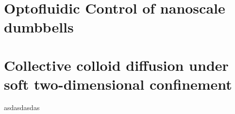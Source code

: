 \documentclass[ twoside,openright,titlepage,numbers=noenddot,%
headinclude,footinclude,cleardoublepage=empty,abstract=on,
BCOR=5mm,paper=a4,fontsize=11pt
]{scrreprt}
\begin{document}
\chapter{Optofluidic Control of nanoscale dumbbells}
\chapter{Collective colloid diffusion under soft two-dimensional confinement}

asdasdasdas
\newpage


\appendix
%

\cleardoublepage
\cleardoublepage
\cleardoublepage
\newpage
\end{document}
